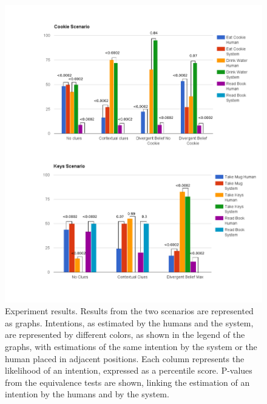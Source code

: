  \begin{figure}[ht!]
	\centering
	\includegraphics[clip,scale=0.7]{img/observer/scenarios_redone_1.pdf}
	\caption[Experiment results]{Experiment results. Results from the two scenarios are represented as graphs. Intentions, as estimated by the humans and the system, are represented by different colors, as shown in the legend of the graphs, with estimations of the same intention by the system or the human placed in adjacent positions. Each column represents the likelihood of an intention, expressed as a percentile score. P-values from the equivalence tests are shown, linking the estimation of an intention by the humans and by the system.}
	\label{fig:observer_experiments-user_study_results}
\end{figure}



